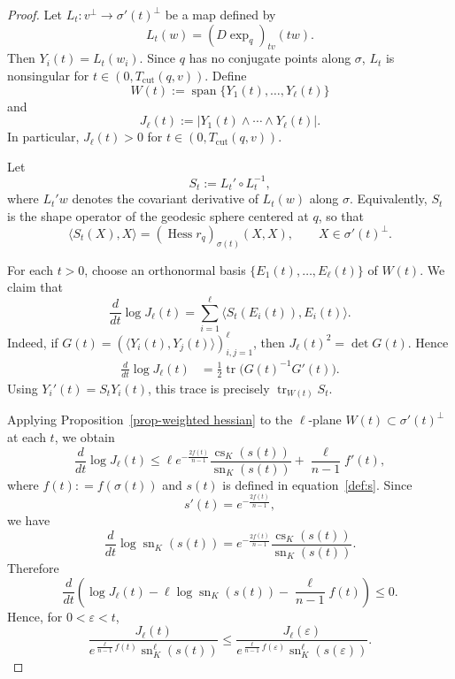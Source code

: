 \documentclass[10pt,a4paper]{amsart}
\begin{document}
\begin{proof}
Let $L_t:v^\perp\to \sigma'(t)^\perp$ be a map defined by
$$
L_t (w)=(D\exp_q)_{tv}(t w).
$$
Then $Y_i(t)=L_t(w_i)$. Since $q$ has no conjugate points along $\sigma$,
$L_t$ is nonsingular for $t \in (0, T_{\mathrm{cut}}(q,v))$. Define
$$
W(t):=
\operatorname{span}\{Y_1(t),\ldots,Y_\ell(t)\}
$$
and
$$
J_\ell(t):=|Y_1(t)\wedge\cdots\wedge Y_\ell(t)|.
$$
In particular, $J_\ell (t) >0 $ for $t \in (0, T_{\mathrm{cut}}(q,v))$.


Let
$$
S_t:=L_t' \circ L_t^{-1},
$$
where $L_t'w$ denotes the covariant derivative of $L_t(w)$ along $\sigma$.
Equivalently, $S_t$ is the shape operator of the geodesic
sphere centered at $q$, so that
$$
\langle S_t(X),X\rangle
=
\left(\operatorname{Hess} r_q\right)_{\sigma(t)}(X,X),
\qquad X\in \sigma'(t)^\perp.
$$

For each $t >0$, choose an orthonormal basis $\{E_1(t),\ldots,E_\ell(t)\}$  of $W(t)$.
We claim that 
$$
\frac{d}{dt}\log J_\ell(t)
=
\sum_{i=1}^\ell \langle S_t(E_i(t)),E_i(t)\rangle .
$$
Indeed, if $G(t)=(\langle Y_i(t),Y_j(t)\rangle)_{i,j=1}^\ell$, then
$J_\ell(t)^2=\det G(t)$. Hence
\begin{align*}
\frac{d}{dt}\log J_\ell(t)
&=
\frac12\operatorname{tr}\bigl(G(t)^{-1}G'(t)\bigr).
\end{align*}
Using $Y_i'(t)=S_tY_i(t)$, this trace is precisely
$\operatorname{tr}_{W(t)}S_t$.

Applying Proposition~\ref{prop-weighted hessian} to the $\ell$-plane
$W(t)\subset \sigma'(t)^\perp$ at each $t$, we obtain
$$
\frac{d}{dt}\log J_\ell(t)
\le
\ell e^{-\frac{2f(t)}{n-1}}
\frac{\operatorname{cs}_K(s(t))}{\operatorname{sn}_K(s(t))}
+
\frac{\ell}{n-1}f'(t),
$$
where $f(t) : = f(\sigma(t))$ and $s(t)$ is defined in equation~\eqref{def:s}.
Since
$$
s'(t)=e^{-\frac{2f(t)}{n-1}},
$$
we have
$$
\frac{d}{dt}\log \operatorname{sn}_K(s(t))
=
e^{-\frac{2f(t)}{n-1}}
\frac{\operatorname{cs}_K(s(t))}{\operatorname{sn}_K(s(t))}.
$$
Therefore
$$
\frac{d}{dt}
\left(
\log J_\ell(t)
-
\ell\log \operatorname{sn}_K(s(t))
-
\frac{\ell}{n-1}f(t)
\right)
\le 0.
$$
Hence, for $0<\varepsilon<t$,
$$
\frac{J_\ell(t)}
{e^{\frac{\ell}{n-1}f(t)}\operatorname{sn}_K^\ell(s(t))}
\le
\frac{J_\ell(\varepsilon)}
{e^{\frac{\ell}{n-1}f(\varepsilon)}
\operatorname{sn}_K^\ell(s(\varepsilon))}.
$$


\end{proof}
\end{document}
